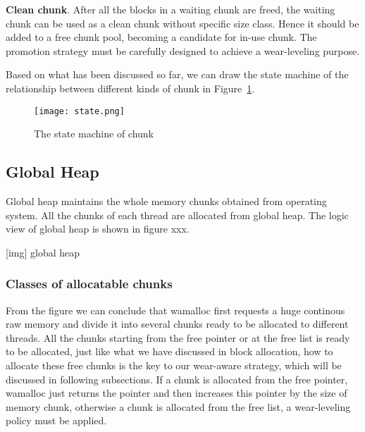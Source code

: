 \documentclass{vldb}
\begin{document}
\textbf{Clean chunk}.
After all the blocks in a waiting chunk are freed, the waiting chunk can be used as a clean chunk without specific size class.
Hence it should be added to a free chunk pool, becoming a candidate for in-use chunk.
The promotion strategy must be carefully designed to achieve a wear-leveling purpose.

Based on what has been discussed so far,
we can draw the state machine of the relationship between different kinds of chunk in Figure~\ref{fig:state}.

\begin{figure}[h]
\centering
\texttt{[image: state.png]}
\caption{The state machine of chunk}
\label{fig:state}
\end{figure}

\subsection{Global Heap}

Global heap maintains the whole memory chunks obtained from operating system. 
All the chunks of each thread are allocated from global heap. 
The logic view of global heap is shown in figure xxx.

[img] global heap

\subsubsection{Classes of allocatable chunks}
From the figure we can conclude that wamalloc first requests a huge continous raw memory and divide it into several chunks ready to be allocated to different threads.
All the chunks starting from the free pointer or at the free list is ready to be allocated, 
just like what we have discussed in block allocation, how to allocate these free chunks is the key to our wear-aware strategy,
which will be discussed in following subsections.
If a chunk is allocated from the free pointer, wamalloc just returns the pointer and then increases this pointer by the size of memory chunk, 
otherwise a chunk is allocated from the free list, a wear-leveling policy must be applied.
\end{document}
